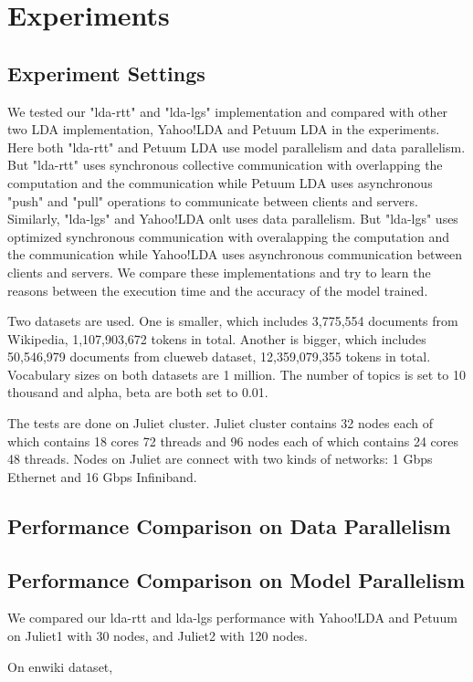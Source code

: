 \documentclass[conference]{IEEEtran}
\begin{document}
\section{Experiments}
\subsection{Experiment Settings}
We tested our "lda-rtt" and "lda-lgs" implementation
and compared with other two LDA implementation, Yahoo!LDA and Petuum LDA in the experiments.
Here both "lda-rtt" and Petuum LDA use model parallelism and data parallelism.
But "lda-rtt" uses synchronous collective communication with overlapping the computation and the communication
while Petuum LDA uses asynchronous "push" and "pull" operations to communicate between clients and servers.
Similarly, "lda-lgs" and Yahoo!LDA onlt uses data parallelism.
But "lda-lgs" uses optimized synchronous communication with overalapping the computation and the communication
while Yahoo!LDA uses asynchronous communication between clients and servers.
We compare these implementations and try to learn the reasons between the execution time
and the accuracy of the model trained. 

Two datasets are used. One is smaller, 
which includes 3,775,554 documents from Wikipedia, 1,107,903,672 tokens in total.
Another is bigger, which includes 50,546,979 documents from clueweb dataset, 12,359,079,355 tokens in total.
Vocabulary sizes on both datasets are 1 million. 
The number of topics is set to 10 thousand and alpha, beta are both set to 0.01.
 
The tests are done on Juliet cluster. 
Juliet cluster contains 32 nodes each of which contains 18 cores 72 threads
and 96 nodes each of which contains 24 cores 48 threads.
Nodes on Juliet are connect with two kinds of networks: 1 Gbps Ethernet and 16 Gbps Infiniband.
%
\subsection{Performance Comparison on Data Parallelism}


\subsection{Performance Comparison on Model Parallelism}
We compared our lda-rtt and lda-lgs performance with Yahoo!LDA and Petuum
on Juliet1 with 30 nodes, and Juliet2 with 120 nodes.

On enwiki dataset,
\end{document}
